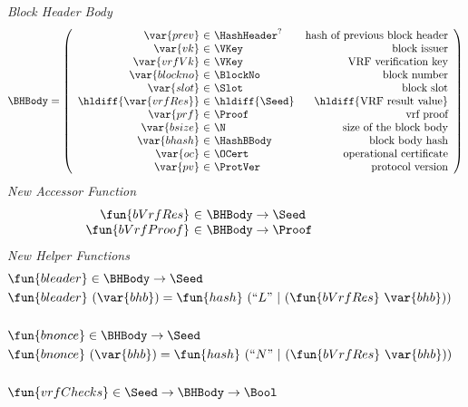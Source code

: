 \begin{figure*}[htb]
  \emph{Block Header Body}
  \begin{equation*}
    \BHBody =
    \left(
      \begin{array}{r@{~\in~}lr}
        \var{prev} & \HashHeader^? & \text{hash of previous block header}\\
        \var{vk} & \VKey & \text{block issuer}\\
        \var{vrfVk} & \VKey & \text{VRF verification key}\\
        \var{blockno} & \BlockNo & \text{block number}\\
        \var{slot} & \Slot & \text{block slot}\\
        \hldiff{\var{vrfRes}} & \hldiff{\Seed} & \hldiff{\text{VRF result value}}\\
        \var{prf} & \Proof & \text{vrf proof}\\
        \var{bsize} & \N & \text{size of the block body}\\
        \var{bhash} & \HashBBody & \text{block body hash}\\
        \var{oc} & \OCert & \text{operational certificate}\\
        \var{pv} & \ProtVer & \text{protocol version}\\
      \end{array}
    \right)
  \end{equation*}
  \emph{New Accessor Function}
  \begin{equation*}
    \begin{array}{r@{~\in~}l}
       \fun{bVrfRes} & \BHBody \to \Seed \\
       \fun{bVrfProof} & \BHBody \to \Proof \\
    \end{array}
  \end{equation*}
  \emph{New Helper Functions}
    \begin{align*}
      & \fun{bleader} \in \BHBody \to \Seed \\
      & \fun{bleader}~(\var{bhb}) = \fun{hash}~(``L"~|~(\fun{bVrfRes}~\var{bhb}))\\
      \\
      & \fun{bnonce} \in \BHBody \to \Seed \\
      & \fun{bnonce}~(\var{bhb}) = \fun{hash}~(``N"~|~(\fun{bVrfRes}~\var{bhb}))\\
      \\
      & \fun{vrfChecks} \in \Seed \to \BHBody \to \Bool \\

\end{align*}
\end{figure*}
